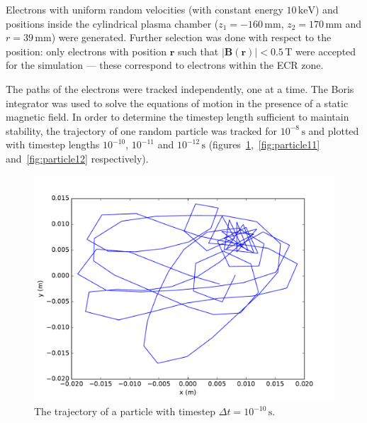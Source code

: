 \documentclass[11pt, a4paper]{article}
\begin{document}
Electrons with uniform random velocities (with constant energy $10\,\si{\kilo\electronvolt}$) and positions inside the cylindrical plasma chamber ($z_1 = -160\,\si{\milli\meter}$, $z_2 = 170\,\si{\milli\meter}$ and $r = 39\,\si{\milli\meter}$) were generated. Further selection was done with respect to the position: only electrons with position $\mathbf{r}$ such that $|\mathbf{B}(\mathbf{r})| < 0.5\,\si{\tesla}$ were accepted for the simulation --- these correspond to electrons within the ECR zone.

The paths of the electrons were tracked independently, one at a time. The Boris integrator was used to solve the equations of motion in the presence of a static magnetic field. In order to determine the timestep length sufficient to maintain stability, the trajectory of one random particle was tracked for $10^{-8}\,\si{\second}$ and plotted with timestep lengths $10^{-10}$, $10^{-11}$ and $10^{-12}\,\si{\second}$ (figures~\ref{fig:particle10},~\ref{fig:particle11} and~\ref{fig:particle12} respectively).
\begin{figure}
    \centering
    \includegraphics[width=\textwidth]{output/particle_trajectory_10.pdf}
    \caption{The trajectory of a particle with timestep $\Delta t = 10^{-10}\,\si{\second}$.}
    \label{fig:particle10}
\end{figure}
\end{document}
